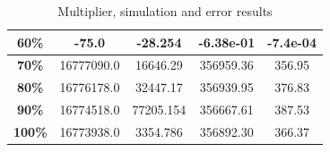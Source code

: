 \documentclass[a4paper]{article}
\begin{document}
\begin{table}[hbtp]
\begin{tabular}{|c|c|c|c|c|}
		\textbf{60\%}                                                                   & 		-75.0                                                                           & 		-28.254                                                                          & -6.38e-01                            &		 -7.4e-04                              \\ \hline
		\textbf{70\%}                                                                   & 		16777090.0                                                                      & 		16646.29                                                                         & 356959.36                            &		 356.95                                \\ \hline
		\textbf{80\%}                                                                   & 		16776178.0                                                                      & 		32447.17                                                                         & 356939.95                            &		 376.83                                \\ \hline
		\textbf{90\%}                                                                   & 		16774518.0                                                                      & 		77205.154                                                                        & 356667.61                            &		 387.53                                \\ \hline
		\textbf{100\%}                                                                  & 		16773938.0                                                                      & 		3354.786                                                                         & 356892.30                            &		 366.37                                \\ \hline
		\end{tabular}
		\caption{Multiplier, simulation and error results}
		\label{tab:mult_sim}
	\end{table}
\end{document}
